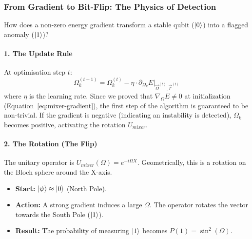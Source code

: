 \documentclass[12pt, a4paper, oneside]{report}
\begin{document}
\subsubsection{From Gradient to Bit-Flip: The Physics of Detection}
\label{sec:coherence-filter}
How does a non-zero energy gradient transform a stable qubit ($\ket{0}$) into a flagged anomaly ($\ket{1}$)?

\paragraph{1. The Update Rule}
At optimisation step $t$:
\begin{equation}
    \Omega_k^{(t+1)} = \Omega_k^{(t)} - \eta \cdot \partial_{\Omega_k} E \big|_{\vec{\Omega}^{(t)}, \vec{\Gamma}^{(t)}}
\end{equation}
where $\eta$ is the learning rate.
Since we proved that $\nabla_{\Omega} E \neq 0$ at initialization (Equation~\ref{eq:mixer-gradient}), the first step of the algorithm is guaranteed to be non-trivial. If the gradient is negative (indicating an instability is detected), $\Omega_k$ becomes positive, activating the rotation $U_{mixer}$.

\paragraph{2. The Rotation (The Flip)}
The unitary operator is $U_{mixer}(\Omega) = e^{-i \Omega X}$. Geometrically, this is a rotation on the Bloch sphere around the X-axis.
\begin{itemize}
    \item \textbf{Start:} $\ket{\psi} \approx \ket{0}$ (North Pole).
    \item \textbf{Action:} A strong gradient induces a large $\Omega$. The operator rotates the vector towards the South Pole ($\ket{1}$).
    \item \textbf{Result:} The probability of measuring $\ket{1}$ becomes $P(1) = \sin^2(\Omega)$.
\end{itemize}
\end{document}
